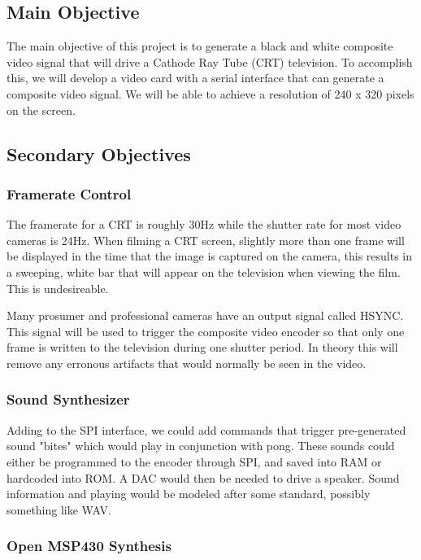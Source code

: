 \subsection*{Main Objective}

The main objective of this project is to generate a black and white composite
video signal that will drive a Cathode Ray Tube (CRT) television. To accomplish
this, we will develop a video card with a serial interface that can generate a
composite video signal. We will be able to achieve a resolution of 240 x 320
pixels on the screen.

\subsection*{Secondary Objectives}

\subsubsection*{Framerate Control}

The framerate for a CRT is roughly 30Hz while the shutter rate for most video
cameras is 24Hz. When filming a CRT screen, slightly more than one frame will be
displayed in the time that the image is captured on the camera, this results in
a sweeping, white bar that will appear on the television when viewing the film.
This is undesireable.

Many prosumer and professional cameras have an output signal called HSYNC. This
signal will be used to trigger the composite video encoder so that only one
frame is written to the television during one shutter period. In theory this
will remove any erronous artifacts that would normally be seen in the video.

\subsubsection*{Sound Synthesizer}

Adding to the SPI interface, we could add commands that trigger pre-generated
sound "bites" which would play in conjunction with pong. These sounds could
either be programmed to the encoder through SPI, and saved into RAM or hardcoded
into ROM. A DAC would then be needed to drive a speaker. Sound information and
playing would be modeled after some standard, possibly something like WAV.

\subsubsection*{Open MSP430 Synthesis}

